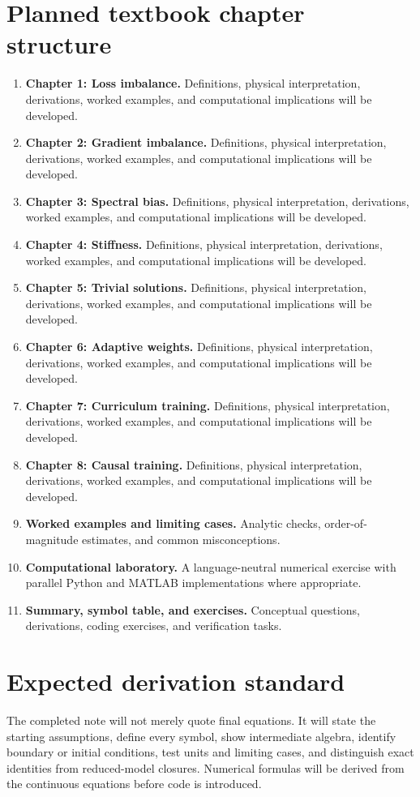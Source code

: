 \documentclass[11pt]{article}
\begin{document}
\section{Planned textbook chapter structure}
\begin{enumerate}[leftmargin=1.8em]
\item \textbf{Chapter 1: Loss imbalance.} Definitions, physical interpretation, derivations, worked examples, and computational implications will be developed.
\item \textbf{Chapter 2: Gradient imbalance.} Definitions, physical interpretation, derivations, worked examples, and computational implications will be developed.
\item \textbf{Chapter 3: Spectral bias.} Definitions, physical interpretation, derivations, worked examples, and computational implications will be developed.
\item \textbf{Chapter 4: Stiffness.} Definitions, physical interpretation, derivations, worked examples, and computational implications will be developed.
\item \textbf{Chapter 5: Trivial solutions.} Definitions, physical interpretation, derivations, worked examples, and computational implications will be developed.
\item \textbf{Chapter 6: Adaptive weights.} Definitions, physical interpretation, derivations, worked examples, and computational implications will be developed.
\item \textbf{Chapter 7: Curriculum training.} Definitions, physical interpretation, derivations, worked examples, and computational implications will be developed.
\item \textbf{Chapter 8: Causal training.} Definitions, physical interpretation, derivations, worked examples, and computational implications will be developed.
\item \textbf{Worked examples and limiting cases.} Analytic checks, order-of-magnitude estimates, and common misconceptions.
\item \textbf{Computational laboratory.} A language-neutral numerical exercise with parallel Python and MATLAB implementations where appropriate.
\item \textbf{Summary, symbol table, and exercises.} Conceptual questions, derivations, coding exercises, and verification tasks.
\end{enumerate}

\section{Expected derivation standard}
The completed note will not merely quote final equations. It will state the starting assumptions, define every symbol, show intermediate algebra, identify boundary or initial conditions, test units and limiting cases, and distinguish exact identities from reduced-model closures. Numerical formulas will be derived from the continuous equations before code is introduced.
\end{document}
